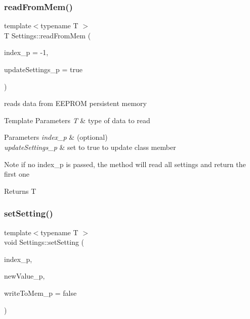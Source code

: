 \subsubsection{\texorpdfstring{read\+From\+Mem()}{readFromMem()}}
{\footnotesize\ttfamily template$<$typename T $>$ \\
T Settings\+::read\+From\+Mem (\begin{DoxyParamCaption}\item[{uint16\+\_\+t}]{index\+\_\+p = {\ttfamily -\/1},  }\item[{bool}]{update\+Settings\+\_\+p = {\ttfamily true} }\end{DoxyParamCaption})\hspace{0.3cm}{\ttfamily [inline]}}



reads data from E\+E\+P\+R\+OM persistent memory 


\begin{DoxyTemplParams}{Template Parameters}
{\em T} & type of data to read \\
\hline
\end{DoxyTemplParams}

\begin{DoxyParams}{Parameters}
{\em index\+\_\+p} & (optional) \\
\hline
{\em update\+Settings\+\_\+p} & set to true to update class member \\
\hline
\end{DoxyParams}
\begin{DoxyNote}{Note}
if no index\+\_\+p is passed, the method will read all settings and return the first one 
\end{DoxyNote}
\begin{DoxyReturn}{Returns}
T 
\end{DoxyReturn}
\mbox{\label{class_settings_ab5a7de6e9d4f0b59d9cf93957e33cf49}} 
\subsubsection{\texorpdfstring{set\+Setting()}{setSetting()}}
{\footnotesize\ttfamily template$<$typename T $>$ \\
void Settings\+::set\+Setting (\begin{DoxyParamCaption}\item[{uint8\+\_\+t}]{index\+\_\+p,  }\item[{T}]{new\+Value\+\_\+p,  }\item[{bool}]{write\+To\+Mem\+\_\+p = {\ttfamily false} }\end{DoxyParamCaption})\hspace{0.3cm}{\ttfamily [inline]}}



